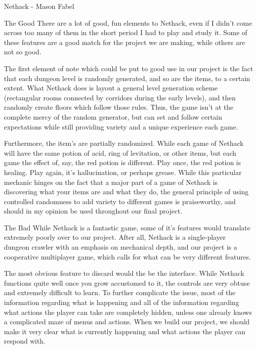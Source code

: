 \documentclass[12pt]{report}
\begin{document}
\begin{section}{Nethack - Mason Fabel}
\begin{subsection}{The Good}
There are a lot of good, fun elements to Nethack, even if I didn't come
across too many of them in the short period I had to play and study it.
Some of these features are a good match for the project we are making,
while others are not so good.

The first element of note which could be put to good use in our project
is the fact that each dungeon level is randomly generated, and so are
the items, to a certain extent. What Nethack does is layout a general
level generation scheme (rectangular rooms connected by corridors during
the early levels), and then randomly create floors which follow those
rules. Thus, the game isn't at the complete mercy of the random generator,
but can set and follow certain expectations while still providing variety
and a unique experience each game.

Furthermore, the item's are partially randomized. While each game of
Nethack will have the same potion of acid, ring of levitation, or other
items, but each game the effect of, say, the red potion is different.
Play once, the red potion is healing. Play again, it's hallucination, or
perhaps grease. While this particular mechanic hinges on the fact that a
major part of a game of Nethack is discovering what your items are and
what they do, the general principle of using controlled randomness to add
variety to different games is praiseworthy, and should in my opinion be
used throughout our final project.
\end{subsection}

\begin{subsection}{The Bad}
While Nethack is a fantastic game, some of it's features would translate
extremely poorly over to our project. After all, Nethack is a single-player
dungeon crawler with an emphasis on mechanical depth, and our project
is a cooperative multiplayer game, which calls for what can be very
different features.

The most obvious feature to discard would the be the interface. While
Nethack functions quite well once you grow accustomed to it, the controls
are very obtuse and extremely difficult to learn. To further complicate
the issue, most of the information regarding what is happening and all of
the information regarding what actions the player can take are completely
hidden, unless one already knows a complicated maze of menus and actions.
When we build our project, we should make it very clear what is currently
happening and what actions the player can respond with.


\end{subsection}
\end{section}
\end{document}
